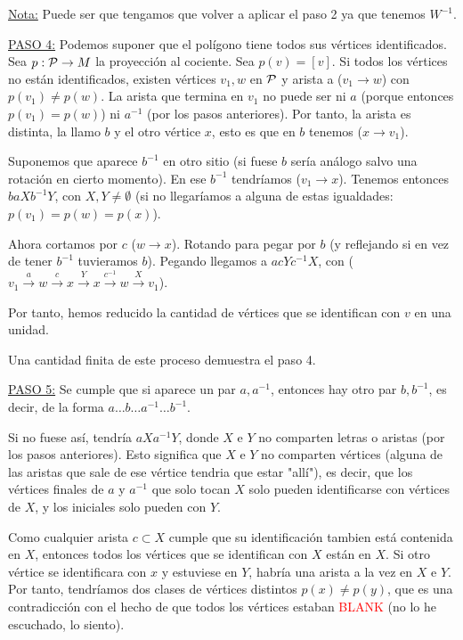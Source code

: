 {    \noindent \underline{Nota:} Puede ser que tengamos que volver a aplicar el paso 2 ya que tenemos $W^{-1}$.

    \noindent \underline{PASO 4:} Podemos suponer que el polígono tiene todos sus vértices identificados.
    Sea $p:\mathcal{P} \to M$ la proyección al cociente. Sea $p(v)=[v]$. Si todos los vértices no están identificados, existen vértices $v_1, w$ en $\mathcal{P}$ y arista a ($v_1 \to w$) con $p(v_1)\ne p(w)$. La arista que termina en $v_1$ no puede ser ni $a$ (porque entonces $p(v_1) = p(w)$) ni $a^{-1}$ (por los pasos anteriores). Por tanto, la arista es distinta, la llamo $b$ y el otro vértice $x$, esto es que en $b$ tenemos ($x \to v_1$). 
    
    \noindent Suponemos que aparece $b^{-1}$ en otro sitio (si fuese $b$ sería análogo salvo una rotación en cierto momento). En ese $b^{-1}$ tendríamos ($v_1 \to x$). Tenemos entonces $baXb^{-1}Y$, con $X,Y \ne \emptyset$ (si no llegaríamos a alguna de estas igualdades: $p(v_1)=p(w)=p(x)$).
    
    \noindent Ahora cortamos por $c$ ($w \to x$). Rotando para pegar por $b$ (y reflejando si en vez de tener $b^{-1}$ tuvieramos $b$). Pegando llegamos a $acYc^{-1}X$, con ($v_1 \overset{a}{\to} w \overset{c}{\to} x \overset{Y}{\to} x \overset{c^{-1}}{\to} w \overset{X}{\to} v_1$).

    \noindent Por tanto, hemos reducido la cantidad de vértices que se identifican con $v$ en una unidad.

    \noindent Una cantidad finita de este proceso demuestra el paso 4.

    \noindent \underline{PASO 5:} Se cumple que si aparece un par $a, a^{-1}$, entonces hay otro par $b, b^{-1}$, es decir, de la forma $a\dots b\dots a^{-1} \dots b^{-1}$.

    \noindent Si no fuese así, tendría $aXa^{-1}Y$, donde $X$ e $Y$ no comparten letras o aristas (por los pasos anteriores). Esto significa que $X$ e $Y$ no comparten vértices (alguna de las aristas que sale de ese vértice tendria que estar "allí"), es decir, que los vértices finales de $a$ y $a^{-1}$ que solo tocan $X$ solo pueden identificarse con vértices de $X$, y los iniciales solo pueden con $Y$.

    \noindent Como cualquier arista $c \subset X$ cumple que su identificación tambien está contenida en $X$, entonces todos los vértices que se identifican con $X$ están en $X$. Si otro vértice se identificara con $x$ y estuviese en $Y$, habría una arista a la vez en $X$ e $Y$. Por tanto, tendríamos dos clases de vértices distintos $p(x) \ne p(y)$, que es una contradicción con el hecho de que todos los vértices estaban \textcolor{red}{BLANK} (no lo he escuchado, lo siento).

}
